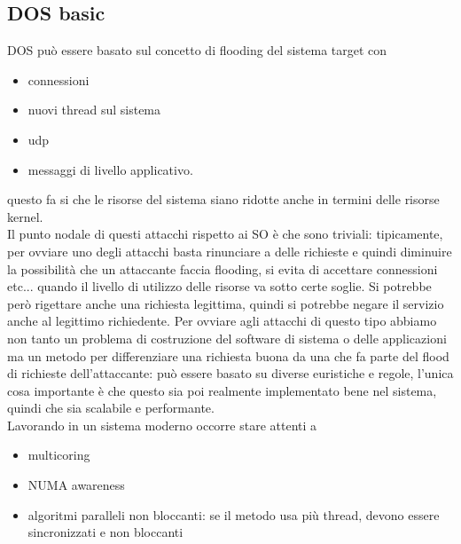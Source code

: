 \documentclass[12pt, oneside]{extbook}
\begin{document}
\subsection{DOS basic}
DOS può essere basato sul concetto di flooding del sistema target con
\begin{itemize}
	\item connessioni
	\item nuovi thread sul sistema
	\item udp
	\item messaggi di livello applicativo.
\end{itemize}
questo fa si che le risorse del sistema siano ridotte anche in termini delle risorse kernel.\\Il punto nodale di questi attacchi rispetto ai SO è che sono triviali: tipicamente, per ovviare uno degli attacchi basta rinunciare a delle richieste e quindi diminuire la possibilità che un attaccante faccia flooding, si evita di accettare connessioni etc... quando il livello di utilizzo delle risorse va sotto certe soglie. Si potrebbe però rigettare anche una richiesta legittima, quindi si potrebbe negare il servizio anche al legittimo richiedente. Per ovviare agli attacchi di questo tipo abbiamo non tanto un problema di costruzione del software di sistema o delle applicazioni ma un metodo per differenziare una richiesta buona da una che fa parte del flood di richieste dell'attaccante: può essere basato su diverse euristiche e regole, l'unica cosa importante è che questo sia poi realmente implementato bene nel sistema, quindi che sia scalabile e performante.\\Lavorando in un sistema moderno occorre stare attenti a 
\begin{itemize}
	\item multicoring
	\item NUMA awareness
	\item algoritmi paralleli non bloccanti: se il metodo usa più thread, devono essere sincronizzati e non bloccanti
\end{itemize}
\end{document}
